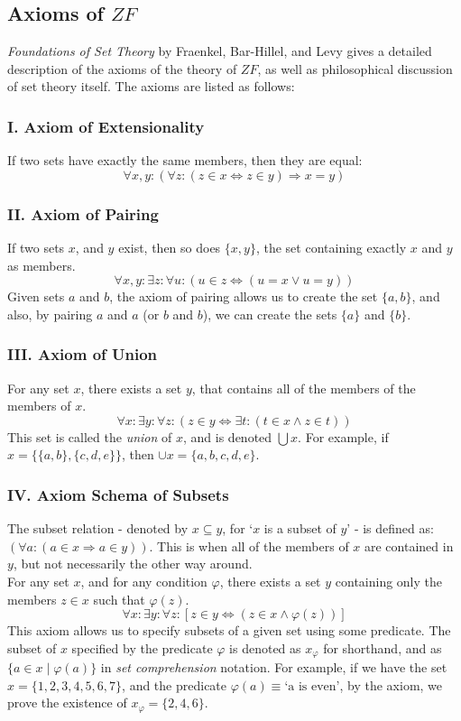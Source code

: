 \documentclass[11pt]{report}
\theoremstyle{definition}
\theoremstyle{theorem}
\theoremstyle{lemma}
\begin{document}
\subsection{Axioms of $\mathit{ZF}$}
\textit{Foundations of Set Theory} by Fraenkel, Bar-Hillel, and Levy \cite{foundations} gives a detailed description of the axioms of the theory of $\mathit{ZF}$, as well as philosophical discussion of set theory itself.
The axioms are listed as follows:

\subsubsection*{I. Axiom of Extensionality}
If two sets have exactly the same members, then they are equal:
$$\forall x,y:(\forall z: (z\in x \Leftrightarrow z\in y) \Rightarrow x=y)$$

\subsubsection*{II. Axiom of Pairing}
If two sets $x$, and $y$ exist, then so does $\{x,y\}$, the set containing exactly $x$ and $y$ as members.
$$\forall x,y: \exists z: \forall u: (u\in z \Leftrightarrow (u=x \vee u=y))$$
Given sets $a$ and $b$, the axiom of pairing allows us to create the set $\{a,b\}$, and also, by pairing $a$ and $a$ (or $b$ and $b$), we can create the sets $\{a\}$ and $\{b\}$.

\subsubsection*{III. Axiom of Union}
For any set $x$, there exists a set $y$, that contains all of the members of the members of $x$.
$$\forall x: \exists y: \forall z: (z\in y \Leftrightarrow \exists t: (t\in x \wedge z\in t))$$
This set is called the \emph{union} of $x$, and is denoted $\bigcup x$.
For example, if $x = \{\{a,b\}, \{c,d,e\}\}$, then $\cup x = \{a,b,c,d,e\}$.

\subsubsection*{IV. Axiom Schema of Subsets}
The subset relation - denoted by $x\subseteq y$, for `$x$ is a subset of $y$' - is defined as: $(\forall a: (a\in x \Rightarrow a\in y))$. This is when all of the members of $x$ are contained in $y$, but not necessarily the other way around.\\

\noindent
For any set $x$, and for any condition $\varphi$, there exists a set $y$ containing only the members $z \in x$ such that $\varphi(z)$.
$$\forall x: \exists y: \forall z: [z\in y \Leftrightarrow (z \in x \wedge \varphi(z))] $$
This axiom allows us to specify subsets of a given set using some predicate. The subset of $x$ specified by the predicate $\varphi$ is denoted as $x_\varphi$ for shorthand, and as $\{a\in x \mid \varphi(a)\}$ in \emph{set comprehension} notation. For example, if we have the set $x = \{1,2,3,4,5,6,7\}$, and the predicate $\varphi(a) \equiv \text{`a is even'}$, by the axiom, we prove the existence of $x_\varphi = \{2,4,6\}$.
\end{document}
